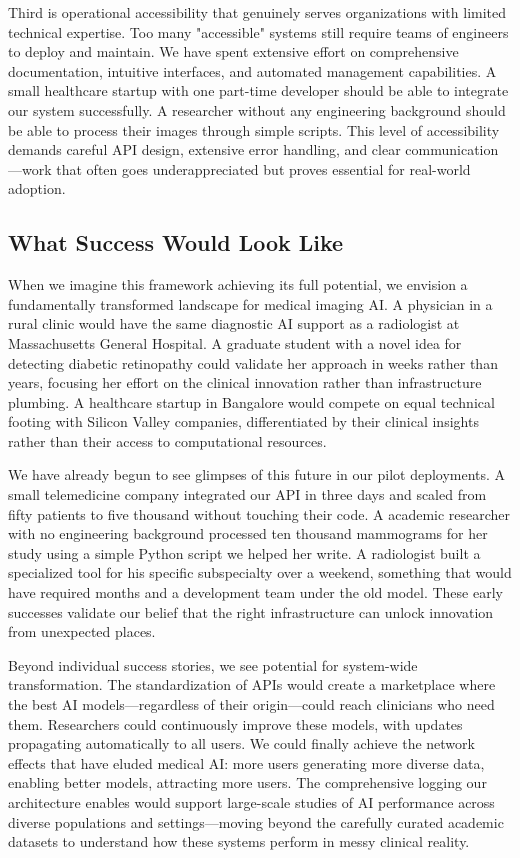 \documentclass[12pt,a4paper]{article}
\begin{document}
Third is operational accessibility that genuinely serves organizations with limited technical expertise. Too many "accessible" systems still require teams of engineers to deploy and maintain. We have spent extensive effort on comprehensive documentation, intuitive interfaces, and automated management capabilities. A small healthcare startup with one part-time developer should be able to integrate our system successfully. A researcher without any engineering background should be able to process their images through simple scripts. This level of accessibility demands careful API design, extensive error handling, and clear communication—work that often goes underappreciated but proves essential for real-world adoption.

\subsection{What Success Would Look Like}

When we imagine this framework achieving its full potential, we envision a fundamentally transformed landscape for medical imaging AI. A physician in a rural clinic would have the same diagnostic AI support as a radiologist at Massachusetts General Hospital. A graduate student with a novel idea for detecting diabetic retinopathy could validate her approach in weeks rather than years, focusing her effort on the clinical innovation rather than infrastructure plumbing. A healthcare startup in Bangalore would compete on equal technical footing with Silicon Valley companies, differentiated by their clinical insights rather than their access to computational resources.

We have already begun to see glimpses of this future in our pilot deployments. A small telemedicine company integrated our API in three days and scaled from fifty patients to five thousand without touching their code. A academic researcher with no engineering background processed ten thousand mammograms for her study using a simple Python script we helped her write. A radiologist built a specialized tool for his specific subspecialty over a weekend, something that would have required months and a development team under the old model. These early successes validate our belief that the right infrastructure can unlock innovation from unexpected places.

Beyond individual success stories, we see potential for system-wide transformation. The standardization of APIs would create a marketplace where the best AI models—regardless of their origin—could reach clinicians who need them. Researchers could continuously improve these models, with updates propagating automatically to all users. We could finally achieve the network effects that have eluded medical AI: more users generating more diverse data, enabling better models, attracting more users. The comprehensive logging our architecture enables would support large-scale studies of AI performance across diverse populations and settings—moving beyond the carefully curated academic datasets to understand how these systems perform in messy clinical reality.
\end{document}
